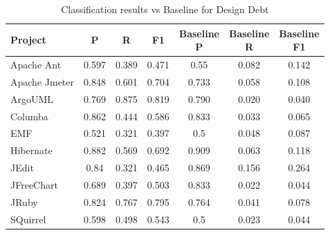 \appendix{}
\label{sec:appendix}



\begin{table}[!hbt]
    \begin{center}
        \caption{Classification results vs Baseline for Design Debt}
        \label{tbl:classifier_results_vs_baseline_design}
        \begin{tabular}{l| c c c c c c}
        \toprule
        \textbf{Project} & \textbf{P} & \textbf{R} & \textbf{F1} & \thead{Baseline\\P} & \thead{Baseline\\R} & \thead{Baseline\\F1} \\
        \midrule
        Apache Ant    &               0.597 &            0.389 &        0.471     & 0.55           & 0.082     & 0.142  \\
        Apache Jmeter &               0.848 &            0.601 &        0.704     & 0.733          & 0.058     & 0.108  \\
        ArgoUML       &               0.769 &            0.875 &        0.819     & 0.790          & 0.020     & 0.040  \\
        Columba       &               0.862 &            0.444 &        0.586     & 0.833          & 0.033     & 0.065  \\
        EMF           &               0.521 &            0.321 &        0.397     & 0.5            & 0.048     & 0.087  \\
        Hibernate     &               0.882 &            0.569 &        0.692     & 0.909          & 0.063     & 0.118  \\
        JEdit         &                0.84 &            0.321 &        0.465     & 0.869          & 0.156     & 0.264  \\
        JFreeChart    &               0.689 &            0.397 &        0.503     & 0.833          & 0.022     & 0.044  \\
        JRuby         &               0.824 &            0.767 &        0.795     & 0.764          & 0.041     & 0.078  \\
        SQuirrel      &               0.598 &            0.498 &        0.543     & 0.5            & 0.023     & 0.044  \\
        \bottomrule
        \end{tabular}
    \end{center}    
\end{table}



